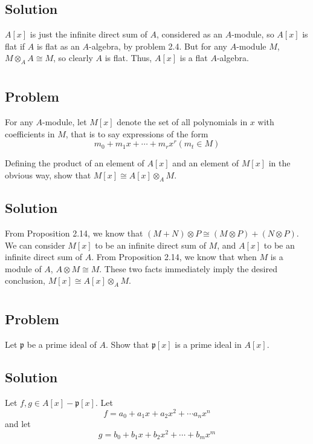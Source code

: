 \documentclass[book,12pt,oneside,openany]{memoir}
\begin{document}
\subsection{Solution}
$A[x]$ is just the infinite direct sum of $A$, considered as an $A$-module, so $A[x]$ is flat if $A$ is flat as an $A$-algebra, by problem 2.4. But for any $A$-module $M$, $M \otimes_A A \cong M$, so clearly $A$ is flat. Thus, $A[x]$ is a flat $A$-algebra.


\section{}
\subsection{Problem}
For any $A$-module, let $M[x]$ denote the set of all polynomials in $x$ with coefficients in $M$, that is to say expressions of the form \[m_0 + m_1x + \cdots + m_rx^r (m_t \in M)\]

Defining the product of an element of $A[x]$ and an element of $M[x]$ in the obvious way, show that $M[x] \cong A[x] \otimes_{A} M$.

\subsection{Solution}
From Proposition 2.14, we know that $(M + N) \otimes P \cong (M \otimes P) + (N \otimes P)$. We can consider $M[x]$ to be an infinite direct sum of $M$, and $A[x]$ to be an infinite direct sum of $A$. From Proposition 2.14, we know that when $M$ is a module of $A$, $A \otimes M \cong M$. These two facts immediately imply the desired conclusion, $M[x] \cong A[x] \otimes_A M$.


\section{}
\subsection{Problem}
Let $\mathfrak{p}$ be a prime ideal of $A$. Show that $\mathfrak{p}[x]$ is a prime ideal in $A[x]$.

\subsection{Solution}
Let $f,g \in A[x] - \mathfrak{p}[x]$. Let \[f = a_0 + a_1x + a_2x^2 + \cdots a_n x^n\] and let \[g = b_0 + b_1 x + b_2 x^2 + \cdots + b_m x^m\]
\end{document}

